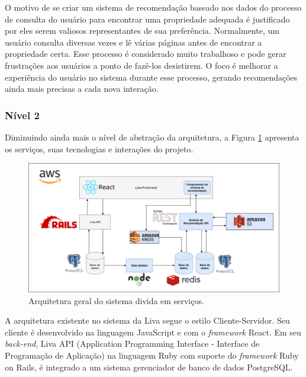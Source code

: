 O motivo de se criar um sistema de recomendação baseado nos dados do processo de consulta do usuário para encontrar uma propriedade adequada é justificado por eles serem valiosos representantes de sua preferência. Normalmente, um usuário consulta diversas vezes e lê várias páginas antes de encontrar a propriedade certa. Esse processo é considerado muito trabalhoso e pode gerar frustrações aos usuários a ponto de fazê-los desistirem. O foco é melhorar a experiência do usuário no sistema durante esse processo, gerando recomendações ainda mais precisas a cada nova interação.

\subsubsection{Nível 2}
\label{nivel2}
Diminuindo ainda mais o nível de abstração da arquitetura, a Figura \ref{fig:sr_nivel2} apresenta os serviços, suas tecnologias e interações do projeto.

\begin{figure}[H]
    \centering
    \includegraphics[scale=0.4]{figuras/proposta/sr_nivel2.png}
    \caption[Arquitetura geral do sistema divida em serviços]{Arquitetura geral do sistema divida em serviços.}
    \label{fig:sr_nivel2}
\end{figure}

A arquitetura existente no sistema da Liva segue o estilo Cliente-Servidor. Seu cliente é desenvolvido na linguagem JavaScript e com o \textit{framework} React. Em seu \textit{back-end}, Liva API (Application Programming Interface - Interface de Programação de Aplicação) na linguagem Ruby com suporte do \textit{framework} Ruby on Rails, é integrado a um sistema gerenciador de banco de dados PostgreSQL.

